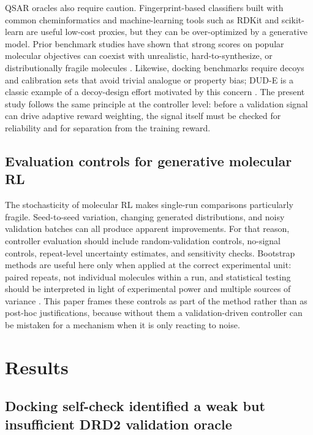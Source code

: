 \documentclass[referee,lineno,pdflatex,sn-basic]{sn-jnl}
\theoremstyle{thmstyleone}%
\theoremstyle{thmstyletwo}%
\theoremstyle{thmstylethree}%
\begin{document}
QSAR oracles also require caution. Fingerprint-based classifiers built with common cheminformatics and machine-learning tools such as RDKit \cite{ref-rdkit} and scikit-learn \cite{ref-sklearn} are useful low-cost proxies, but they can be over-optimized by a generative model. Prior benchmark studies have shown that strong scores on popular molecular objectives can coexist with unrealistic, hard-to-synthesize, or distributionally fragile molecules \cite{ref-gao-synth,ref-pmo}. Likewise, docking benchmarks require decoys and calibration sets that avoid trivial analogue or property bias; DUD-E is a classic example of a decoy-design effort motivated by this concern \cite{ref-dude}. The present study follows the same principle at the controller level: before a validation signal can drive adaptive reward weighting, the signal itself must be checked for reliability and for separation from the training reward.

\subsection{Evaluation controls for generative molecular RL}\label{subsec:rw_controls}

The stochasticity of molecular RL makes single-run comparisons particularly fragile. Seed-to-seed variation, changing generated distributions, and noisy validation batches can all produce apparent improvements. For that reason, controller evaluation should include random-validation controls, no-signal controls, repeat-level uncertainty estimates, and sensitivity checks. Bootstrap methods \cite{ref-bootstrap} are useful here only when applied at the correct experimental unit: paired repeats, not individual molecules within a run, and statistical testing should be interpreted in light of experimental power and multiple sources of variance \cite{ref-dror-significance}. This paper frames these controls as part of the method rather than as post-hoc justifications, because without them a validation-driven controller can be mistaken for a mechanism when it is only reacting to noise.

\section{Results}\label{sec:results}

\subsection{Docking self-check identified a weak but insufficient DRD2 validation oracle}\label{subsec:docking}
\end{document}
